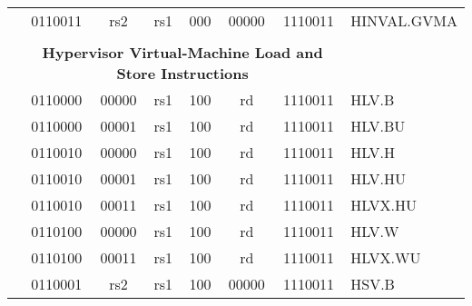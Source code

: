 \begin{table}[p]
\begin{small}
\begin{center}
\begin{tabular}{p{0in}p{0.4in}p{0.05in}p{0.05in}p{0.05in}p{0.05in}p{0.4in}p{0.6in}p{0.4in}p{0.6in}p{0.7in}l}
&
\multicolumn{4}{|c|}{0110011} &
\multicolumn{2}{c|}{rs2} &
\multicolumn{1}{c|}{rs1} &
\multicolumn{1}{c|}{000} &
\multicolumn{1}{c|}{00000} &
\multicolumn{1}{c|}{1110011} & HINVAL.GVMA \\
\cline{2-11}
  

&
\multicolumn{10}{c}{} & \\
&
\multicolumn{10}{c}{\bf Hypervisor Virtual-Machine Load and Store Instructions} & \\
\cline{2-11}


&
\multicolumn{4}{|c|}{0110000} &
\multicolumn{2}{c|}{00000} &
\multicolumn{1}{c|}{rs1} &
\multicolumn{1}{c|}{100} &
\multicolumn{1}{c|}{rd} &
\multicolumn{1}{c|}{1110011} & HLV.B \\
\cline{2-11}


&
\multicolumn{4}{|c|}{0110000} &
\multicolumn{2}{c|}{00001} &
\multicolumn{1}{c|}{rs1} &
\multicolumn{1}{c|}{100} &
\multicolumn{1}{c|}{rd} &
\multicolumn{1}{c|}{1110011} & HLV.BU \\
\cline{2-11}


&
\multicolumn{4}{|c|}{0110010} &
\multicolumn{2}{c|}{00000} &
\multicolumn{1}{c|}{rs1} &
\multicolumn{1}{c|}{100} &
\multicolumn{1}{c|}{rd} &
\multicolumn{1}{c|}{1110011} & HLV.H \\
\cline{2-11}


&
\multicolumn{4}{|c|}{0110010} &
\multicolumn{2}{c|}{00001} &
\multicolumn{1}{c|}{rs1} &
\multicolumn{1}{c|}{100} &
\multicolumn{1}{c|}{rd} &
\multicolumn{1}{c|}{1110011} & HLV.HU \\
\cline{2-11}


&
\multicolumn{4}{|c|}{0110010} &
\multicolumn{2}{c|}{00011} &
\multicolumn{1}{c|}{rs1} &
\multicolumn{1}{c|}{100} &
\multicolumn{1}{c|}{rd} &
\multicolumn{1}{c|}{1110011} & HLVX.HU \\
\cline{2-11}


&
\multicolumn{4}{|c|}{0110100} &
\multicolumn{2}{c|}{00000} &
\multicolumn{1}{c|}{rs1} &
\multicolumn{1}{c|}{100} &
\multicolumn{1}{c|}{rd} &
\multicolumn{1}{c|}{1110011} & HLV.W \\
\cline{2-11}


&
\multicolumn{4}{|c|}{0110100} &
\multicolumn{2}{c|}{00011} &
\multicolumn{1}{c|}{rs1} &
\multicolumn{1}{c|}{100} &
\multicolumn{1}{c|}{rd} &
\multicolumn{1}{c|}{1110011} & HLVX.WU \\
\cline{2-11}


&
\multicolumn{4}{|c|}{0110001} &
\multicolumn{2}{c|}{rs2} &
\multicolumn{1}{c|}{rs1} &
\multicolumn{1}{c|}{100} &
\multicolumn{1}{c|}{00000} &
\multicolumn{1}{c|}{1110011} & HSV.B \\
\cline{2-11}



\end{tabular}
\end{center}
\end{small}
\end{table}
